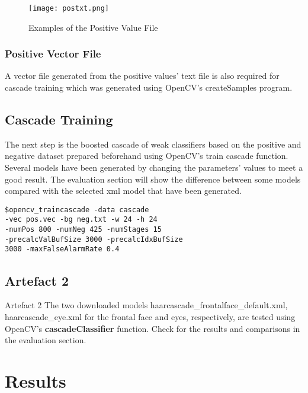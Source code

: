             \begin{figure}[H]
                \centering
                \texttt{[image: postxt.png]}
                \caption{Examples of the Positive Value File}
                \label{postxt}
            \end{figure}

        \subsubsection{Positive Vector File}
            A vector file generated from the positive values' text file is
            also required for cascade training which was generated using
            OpenCV's createSamples program.

    \subsection{Cascade Training}
        The next step is the boosted cascade of weak classifiers based
        on the positive and negative dataset prepared beforehand using
        OpenCV's train cascade function. Several models have been
        generated by changing the parameters' values to meet a good
        result. The evaluation section will show the difference
        between some models compared with the selected xml model that
        have been generated.

            \begin{verbatim}
$opencv_traincascade -data cascade 
-vec pos.vec -bg neg.txt -w 24 -h 24 
-numPos 800 -numNeg 425 -numStages 15
-precalcValBufSize 3000 -precalcIdxBufSize 
3000 -maxFalseAlarmRate 0.4
            \end{verbatim}

\subsection{Artefact 2}

    Artefact 2 The two downloaded models
    haarcascade\_frontalface\_default.xml, haarcascade\_eye.xml for
    the frontal face and eyes, respectively,  are tested using
    OpenCV's \textbf{cascadeClassifier} function. Check for the
    results and comparisons in the evaluation section.
    
\section{Results}